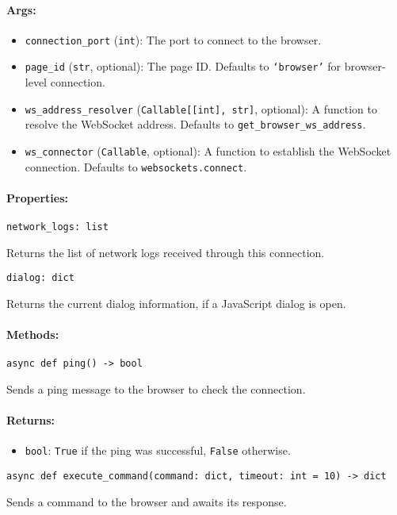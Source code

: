 \documentclass{article}
\begin{document}
\paragraph{Args:}
\begin{itemize}
    \item \texttt{connection\_port} (\texttt{int}): The port to connect to the browser.
    \item \texttt{page\_id} (\texttt{str}, optional): The page ID\@. Defaults to \texttt{`browser'} for browser-level connection.
    \item \texttt{ws\_address\_resolver} (\texttt{Callable[[int], str]}, optional): A function to resolve the WebSocket address. Defaults to \texttt{get\_browser\_ws\_address}.
    \item \texttt{ws\_connector} (\texttt{Callable}, optional): A function to establish the WebSocket connection. Defaults to \texttt{websockets.connect}.
\end{itemize}

\paragraph{Properties:}
\noindent\texttt{network\_logs: list}

\noindent Returns the list of network logs received through this connection.

\noindent\texttt{dialog: dict}

\noindent Returns the current dialog information, if a JavaScript dialog is open.

\paragraph{Methods:}
\noindent\texttt{async def ping() -> bool}

\noindent Sends a ping message to the browser to check the connection.

\paragraph{Returns:}
\begin{itemize}
    \item \texttt{bool}: \texttt{True} if the ping was successful, \texttt{False} otherwise.
\end{itemize}

\noindent\texttt{async def execute\_command(command: dict, timeout: int = 10) -> dict}

\noindent Sends a command to the browser and awaits its response.
\end{document}
